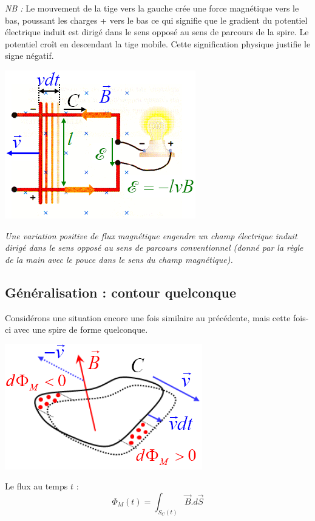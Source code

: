 \documentclass	[11pt, a4paper, openany]{book}
\begin{document}
\textit{NB :} Le mouvement de la tige vers la gauche crée une force magnétique vers le bas, poussant les charges + vers le bas ce qui signifie que le gradient du potentiel électrique induit est dirigé dans le sens opposé au sens de parcours de la spire. Le potentiel croît en descendant la tige mobile. Cette signification physique justifie le signe négatif. 
\begin{center}
	\includegraphics[scale=0.45]{em/image11.png}\\
\end{center}
\textit{Une variation positive de flux magnétique engendre un champ électrique induit dirigé dans le sens opposé au sens de parcours conventionnel (donné par la règle de la main avec le pouce dans le sens du champ magnétique).}

\subsection{Généralisation : contour quelconque}
Considérons une situation encore une fois similaire au précédente, mais cette fois-ci avec une spire de forme quelconque.
\begin{center}
	\includegraphics[scale=0.45]{em/image12.png}\\
\end{center}
Le flux au temps $t$ :
\begin{equation}
	\Phi_M(t)= \int_{S_C(t)} \vec{B}.d\vec{S}
\end{equation}
\end{document}

